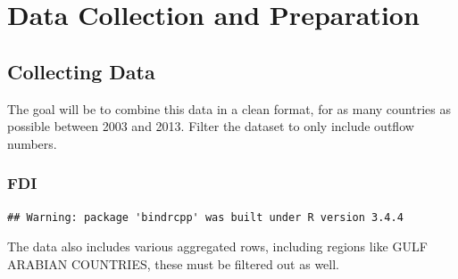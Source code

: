 \documentclass[12pt,]{article}
\newenvironment{Shaded}{\begin{snugshade}}{\end{snugshade}}
\newcommand{\CommentTok}[1]{\textcolor[rgb]{0.56,0.35,0.01}{\textit{#1}}}
\newcommand{\DataTypeTok}[1]{\textcolor[rgb]{0.13,0.29,0.53}{#1}}
\newcommand{\KeywordTok}[1]{\textcolor[rgb]{0.13,0.29,0.53}{\textbf{#1}}}
\newcommand{\NormalTok}[1]{#1}
\newcommand{\OperatorTok}[1]{\textcolor[rgb]{0.81,0.36,0.00}{\textbf{#1}}}
\newcommand{\OtherTok}[1]{\textcolor[rgb]{0.56,0.35,0.01}{#1}}
\newcommand{\StringTok}[1]{\textcolor[rgb]{0.31,0.60,0.02}{#1}}
\begin{document}
\hypertarget{data-collection-and-preparation}{%
\section{Data Collection and
Preparation}\label{data-collection-and-preparation}}

\hypertarget{collecting-data}{%
\subsection{Collecting Data}\label{collecting-data}}

The goal will be to combine this data in a clean format, for as many
countries as possible between 2003 and 2013. Filter the dataset to only
include outflow numbers.

\hypertarget{fdi}{%
\subsubsection{FDI}\label{fdi}}

\begin{Shaded}
\end{Shaded}

\begin{verbatim}
## Warning: package 'bindrcpp' was built under R version 3.4.4
\end{verbatim}

The data also includes various aggregated rows, including regions like
GULF ARABIAN COUNTRIES, these must be filtered out as well.
\end{document}
